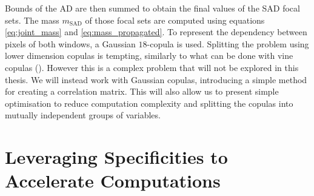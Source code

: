 Bounds of the AD are then summed to obtain the final values of the SAD focal sets. The mass $m_{\mathrm{SAD}}$ of those focal sets are computed using equations \eqref{eq:joint_mass} and \eqref{eq:mass_propagated}. To represent the dependency between pixels of both windows, a Gaussian $18$-copula is used. Splitting the problem using lower dimension copulas is tempting, similarly to what can be done with vine copulas (\cite{czado_vine_2022}). However this is a complex problem that will not be explored in this thesis. We will instead work with Gaussian copulas, introducing a simple method for creating a correlation matrix. This will also allow us to present simple optimisation to reduce computation complexity and splitting the copulas into mutually independent groups of variables. 

\section{Leveraging Specificities to Accelerate Computations}

